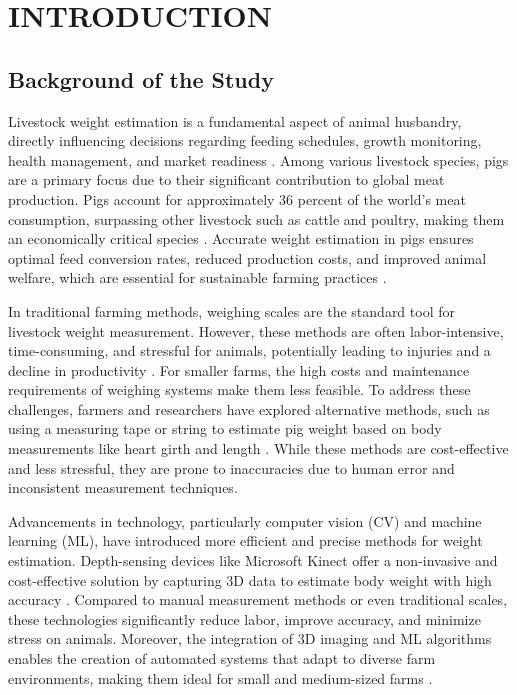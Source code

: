\chapter{INTRODUCTION}

{\baselineskip

\section{Background of the Study}

Livestock weight estimation is a fundamental aspect of animal husbandry, directly influencing decisions regarding feeding schedules, growth monitoring, health management, and market readiness \citep{wang2024review}. Among various livestock species, pigs are a primary focus due to their significant contribution to global meat production. Pigs account for approximately 36 percent of the world's meat consumption, surpassing other livestock such as cattle and poultry, making them an economically critical species \citep{FAO2022}. Accurate weight estimation in pigs ensures optimal feed conversion rates, reduced production costs, and improved animal welfare, which are essential for sustainable farming practices \citep{terence2024systematic}.

In traditional farming methods, weighing scales are the standard tool for livestock weight measurement. However, these methods are often labor-intensive, time-consuming, and stressful for animals, potentially leading to injuries and a decline in productivity \citep{faucitano2018transport}. For smaller farms, the high costs and maintenance requirements of weighing systems make them less feasible. To address these challenges, farmers and researchers have explored alternative methods, such as using a measuring tape or string to estimate pig weight based on body measurements like heart girth and length \citep{ThePigSite}. While these methods are cost-effective and less stressful, they are prone to inaccuracies due to human error and inconsistent measurement techniques.

Advancements in technology, particularly computer vision (CV) and machine learning (ML), have introduced more efficient and precise methods for weight estimation. Depth-sensing devices like Microsoft Kinect offer a non-invasive and cost-effective solution by capturing 3D data to estimate body weight with high accuracy \citep{pezzuolo2018barn}. Compared to manual measurement methods or even traditional scales, these technologies significantly reduce labor, improve accuracy, and minimize stress on animals. Moreover, the integration of 3D imaging and ML algorithms enables the creation of automated systems that adapt to diverse farm environments, making them ideal for small and medium-sized farms \citep{gjergji2020deep}.

}
